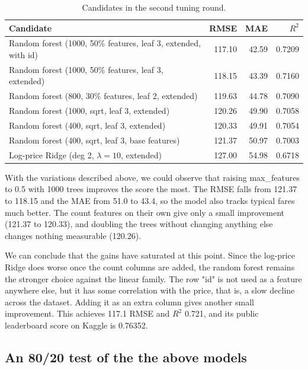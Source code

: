 \documentclass[11pt]{article}
\begin{document}
\begin{table}[H]
\centering
\small
\setlength{\tabcolsep}{5pt}
\begin{tabular}{@{}>{\raggedright\arraybackslash}p{7.6cm}rrr@{}}
\toprule
Candidate & RMSE & MAE & $R^2$ \\
\midrule
Random forest (1000, 50\% features, leaf 3, extended, with id) & 117.10 & 42.59 & 0.7209 \\
Random forest (1000, 50\% features, leaf 3, extended) & 118.15 & 43.39 & 0.7160 \\
Random forest (800, 30\% features, leaf 2, extended) & 119.63 & 44.78 & 0.7090 \\
Random forest (1000, sqrt, leaf 3, extended) & 120.26 & 49.90 & 0.7058 \\
Random forest (400, sqrt, leaf 3, extended) & 120.33 & 49.91 & 0.7054 \\
Random forest (400, sqrt, leaf 3, base features) & 121.37 & 50.97 & 0.7003 \\
Log-price Ridge (deg 2, $\lambda=10$, extended) & 127.00 & 54.98 & 0.6718 \\
\bottomrule
\end{tabular}
\caption{Candidates in the second tuning round.}
\label{tab:retune}
\end{table}

With the variations described above, we could observe that raising max\_features to 0.5 with 1000 trees improves the score the most. The RMSE falls from 121.37 to 118.15 and the MAE from 51.0 to 43.4, so the model also tracks typical fares much better. The count features on their own give only a small improvement (121.37 to 120.33), and doubling the trees without changing anything else changes nothing measurable (120.26).

We can conclude that the gains have saturated at this point. Since the log-price Ridge does worse once the count columns are added, the random forest remains the stronger choice against the linear family. The row "id" is not used as a feature anywhere else, but it has some correlation with the price, that is, a slow decline across the dataset. Adding it as an extra column gives another small improvement. This achieves 117.1 RMSE and $R^2$ 0.721, and its public leaderboard score on Kaggle is 0.76352.

\subsection{An 80/20 test of the the above models}
\end{document}
